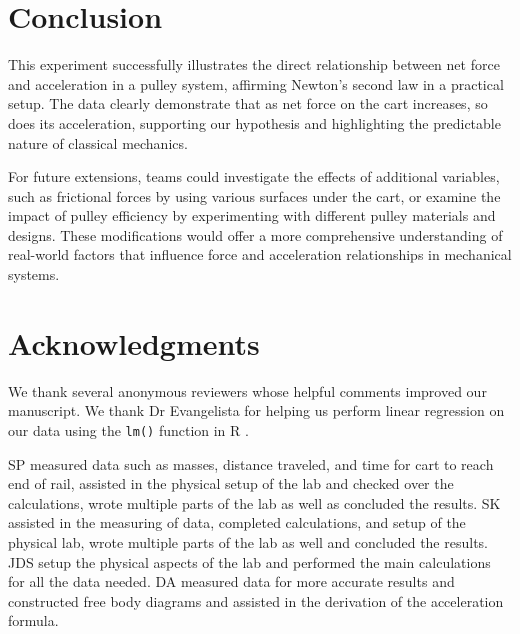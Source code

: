 ﻿\documentclass[reprint,amsmath,amssymb,aps]{revtex4-2}
\begin{document}
\section{Conclusion}


This experiment successfully illustrates the direct relationship between net force and acceleration in a pulley system, affirming Newton's second law \cite{tipler} in a practical setup. The data clearly demonstrate that as net force on the cart increases, so does its acceleration, supporting our hypothesis and highlighting the predictable nature of classical mechanics.

For future extensions, teams could investigate the effects of additional variables, such as frictional forces by using various surfaces under the cart, or examine the impact of pulley efficiency by experimenting with different pulley materials and designs. These modifications would offer a more comprehensive understanding of real-world factors that influence force and acceleration relationships in mechanical systems.









\section{Acknowledgments}\label{sec:Acknowledgements}


We thank several anonymous reviewers whose helpful comments improved our manuscript. We thank Dr Evangelista for helping us perform linear regression on our data using the \texttt{lm()} function in R \cite{R2024}. 

SP measured data such as masses, distance traveled, and time for cart to reach end of rail, assisted in the physical setup of the lab and checked over the calculations, wrote multiple parts of the lab as well as concluded the results.  SK assisted in the measuring of data, completed calculations, and setup of the physical lab, wrote multiple parts of the lab as well and concluded the results. JDS setup the physical aspects of the lab and performed the main calculations for all the data needed. DA measured data for more accurate results and constructed free body diagrams and assisted in the derivation of the acceleration formula.
\end{document}
